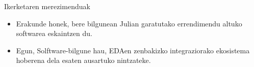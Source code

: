 \documentclass[
 10pt,%
 compress,%
 t,       %
 xcolor=svgnames
]{beamer}
\theoremstyle{definition} \newtheorem{definicion}{Definicion}[section]
\theoremstyle{propiedades} \newtheorem{propiedades}{Propiedades}[section]
\begin{document}
\begin{frame}{Ikerketaren merezimenduak}
{\begin{itemize}
			\medskip
			\item Erakunde honek, bere bilgunean  Julian garatutako errendimendu altuko softwarea eskaintzen du.   
			
			\medskip
			\item Egun, Solftware-bilgune hau, EDAen zenbakizko integraziorako ekosistema hoberena dela esaten ausartuko nintzateke.
%			
		\end{itemize}
		
		
		
	}
	
\end{frame}

\end{document}
